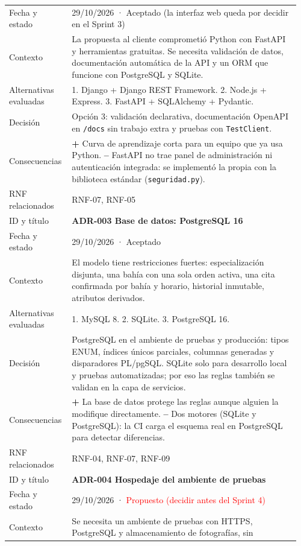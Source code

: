 {\begin{longtable}{@{}L{0.2\linewidth}L{0.76\linewidth}@{}}
Fecha y estado & 29/10/2026 · Aceptado (la interfaz web queda por decidir en el Sprint 3) \\
Contexto & La propuesta al cliente comprometió Python con FastAPI y herramientas gratuitas. Se necesita
validación de datos, documentación automática de la API y un ORM que funcione con PostgreSQL y SQLite. \\
Alternativas evaluadas & 1. Django + Django REST Framework. 2. Node.js + Express. 3. FastAPI + SQLAlchemy +
Pydantic. \\
Decisión & Opción 3: validación declarativa, documentación OpenAPI en \texttt{/docs} sin trabajo extra y
pruebas con \texttt{TestClient}. \\
Consecuencias & \textbf{+} Curva de aprendizaje corta para un equipo que ya usa Python. \textbf{--} FastAPI
no trae panel de administración ni autenticación integrada: se implementó la propia con la biblioteca
estándar (\texttt{seguridad.py}). \\
RNF relacionados & RNF-07, RNF-05 \\
\midrule
ID y título & \textbf{ADR-003 Base de datos: PostgreSQL 16} \\
Fecha y estado & 29/10/2026 · Aceptado \\
Contexto & El modelo tiene restricciones fuertes: especialización disjunta, una bahía con una sola orden
activa, una cita confirmada por bahía y horario, historial inmutable, atributos derivados. \\
Alternativas evaluadas & 1. MySQL 8. 2. SQLite. 3. PostgreSQL 16. \\
Decisión & PostgreSQL en el ambiente de pruebas y producción: tipos ENUM, índices únicos parciales,
columnas generadas y disparadores PL/pgSQL. SQLite solo para desarrollo local y pruebas automatizadas;
por eso las reglas también se validan en la capa de servicios. \\
Consecuencias & \textbf{+} La base de datos protege las reglas aunque alguien la modifique directamente.
\textbf{--} Dos motores (SQLite y PostgreSQL): la CI carga el esquema real en PostgreSQL para detectar
diferencias. \\
RNF relacionados & RNF-04, RNF-07, RNF-09 \\
\midrule
ID y título & \textbf{ADR-004 Hospedaje del ambiente de pruebas} \\
Fecha y estado & 29/10/2026 · \textcolor{red}{Propuesto (decidir antes del Sprint 4)} \\
Contexto & Se necesita un ambiente de pruebas con HTTPS, PostgreSQL y almacenamiento de fotografías, sin

\end{longtable}}
